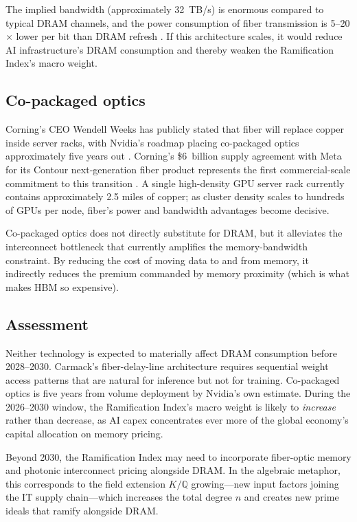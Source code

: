 \documentclass[12pt]{article}
\theoremstyle{definition}
\newcommand{\Q}{\mathbb{Q}}
\begin{document}
The implied bandwidth (approximately 32~TB/s) is enormous compared to typical DRAM channels, and the power consumption of fiber transmission is 5--20$\times$ lower per bit than DRAM refresh \cite{CorningTranscript2025}. If this architecture scales, it would reduce AI infrastructure's DRAM consumption and thereby weaken the Ramification Index's macro weight.

\subsection{Co-packaged optics}

Corning's CEO Wendell Weeks has publicly stated that fiber will replace copper inside server racks, with Nvidia's roadmap placing co-packaged optics approximately five years out \cite{CorningTranscript2025}. Corning's \$6~billion supply agreement with Meta for its Contour next-generation fiber product represents the first commercial-scale commitment to this transition \cite{CorningTranscript2025}. A single high-density GPU server rack currently contains approximately 2.5 miles of copper; as cluster density scales to hundreds of GPUs per node, fiber's power and bandwidth advantages become decisive.

Co-packaged optics does not directly substitute for DRAM, but it alleviates the interconnect bottleneck that currently amplifies the memory-bandwidth constraint. By reducing the cost of moving data to and from memory, it indirectly reduces the premium commanded by memory proximity (which is what makes HBM so expensive).

\subsection{Assessment}

Neither technology is expected to materially affect DRAM consumption before 2028--2030. Carmack's fiber-delay-line architecture requires sequential weight access patterns that are natural for inference but not for training. Co-packaged optics is five years from volume deployment by Nvidia's own estimate. During the 2026--2030 window, the Ramification Index's macro weight is likely to \emph{increase} rather than decrease, as AI capex concentrates ever more of the global economy's capital allocation on memory pricing.

Beyond 2030, the Ramification Index may need to incorporate fiber-optic memory and photonic interconnect pricing alongside DRAM. In the algebraic metaphor, this corresponds to the field extension $K/\Q$ growing---new input factors joining the IT supply chain---which increases the total degree $n$ and creates new prime ideals that ramify alongside DRAM.
\end{document}
